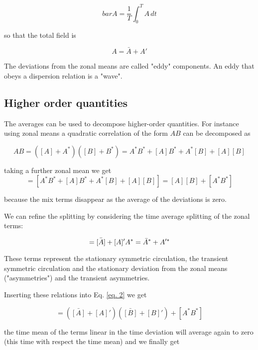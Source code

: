 \begin{equation}
	bar{A} = \frac{1}{T}\int_0^{T} A \, dt
\end{equation}

so that the total field is

\begin{equation}
	A = \bar{A} + A'
\end{equation}

The deviations from the zonal means are called "eddy" components. An
eddy that obeys a dispersion relation is a "wave".

\subsection{Higher order quantities}

The averages can be used to decompose higher-order quantities. For
instance using zonal means a quadratic correlation of the form \(A B\)
can be decomposed as

\begin{equation}
	A B = ([A]+A^*)([B]+B^*) = A^*B^* + [A] B^*+ A^*[B] + [A][B]
\end{equation}

taking a further zonal mean we get
\begin{equation}\label{eq. 2}
	= [A^*B^*+ [A]B^* + A^*[B] + [A][B]] =  [A][B] + [A^*B^*]
\end{equation}

because the mix terms disappear as the average of the deviations is
zero.

We can refine the splitting by considering the time average splitting of
the zonal terms:

\begin{equation}
	= \bar{[A]} + [A]' \\
	A^* = \bar{A}^* + A'^*
\end{equation}

These terms represent the stationary symmetric circulation, the
transient symmetric circulation and the stationary deviation from the
zonal means ("asymmetries") and the transient asymmetries.

Inserting these relations into Eq. \ref{eq. 2} we get


\begin{equation}
	= (\bar{[A]} + [A]')(\bar{[B]} + [B]') + [A^*B^*]
\end{equation}

the time mean of the terms linear in the time deviation will average
again to zero (this time with respect the time mean) and we finally get

